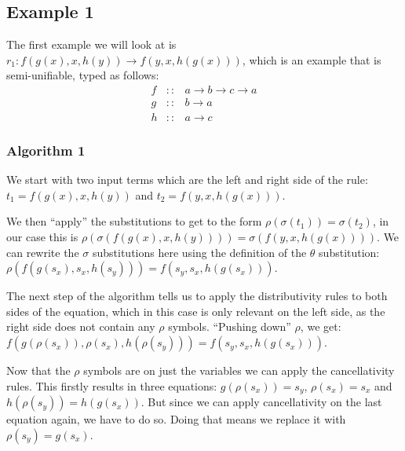 \subsection*{Example 1}
The first example we will look at is $r_1 : f(g(x), x, h(y)) \rightarrow f(y, x, h(g(x)))$, which is an example that is semi-unifiable, typed as follows: 
$$
\begin{array}{rcl}
    f & :: & a \rightarrow b \rightarrow c \rightarrow a \\
    g & :: & b \rightarrow a \\
    h & :: & a \rightarrow c 
\end{array}
$$
\subsubsection*{Algorithm 1}
We start with two input terms which are the left and right side of the rule: $t_1 = f(g(x), x, h(y))$ and $t_2 = f(y, x, h(g(x)))$.

We then ``apply'' the substitutions to get to the form $\rho(\sigma(t_1)) = \sigma(t_2)$, in our case this is $\rho(\sigma(f(g(x), x, h(y)))) = \sigma(f(y, x, h(g(x))))$. We can rewrite the $\sigma$ substitutions here using the definition of the $\theta$ substitution: $\rho(f(g(s_x), s_x, h(s_y))) = f(s_y, s_x, h(g(s_x)))$.

The next step of the algorithm tells us to apply the distributivity rules to both sides of the equation, which in this case is only relevant on the left side, as the right side does not contain any $\rho$ symbols. ``Pushing down'' $\rho$, we get: $f(g(\rho(s_x)), \rho(s_x), h(\rho(s_y))) = f(s_y, s_x, h(g(s_x)))$.

Now that the $\rho$ symbols are on just the variables we can apply the cancellativity rules. This firstly results in three equations: $g(\rho(s_x)) = s_y$, $\rho(s_x) = s_x$ and $h(\rho(s_y)) = h(g(s_x))$. But since we can apply cancellativity on the last equation again, we have to do so. Doing that means we replace it with $\rho(s_y) = g(s_x)$.

